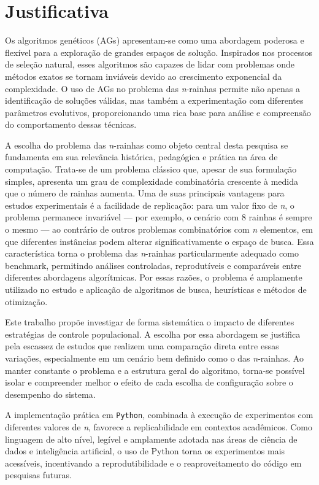\section{Justificativa}

Os algoritmos genéticos (AGs) apresentam-se como uma abordagem poderosa e flexível para a exploração de grandes espaços de solução. Inspirados nos processos de seleção natural, esses algoritmos são capazes de lidar com problemas onde métodos exatos se tornam inviáveis devido ao crescimento exponencial da complexidade. O uso de AGs no problema das \textit{n}-rainhas permite não apenas a identificação de soluções válidas, mas também a experimentação com diferentes parâmetros evolutivos, proporcionando uma rica base para análise e compreensão do comportamento dessas técnicas.

A escolha do problema das \textit{n}-rainhas como objeto central desta pesquisa se fundamenta em sua relevância histórica, pedagógica e prática na área de computação. Trata-se de um problema clássico que, apesar de sua formulação simples, apresenta um grau de complexidade combinatória crescente à medida que o número de rainhas aumenta. Uma de suas principais vantagens para estudos experimentais é a facilidade de replicação: para um valor fixo de \textit{n}, o problema permanece invariável — por exemplo, o cenário com 8 rainhas é sempre o mesmo — ao contrário de outros problemas combinatórios com \textit{n} elementos, em que diferentes instâncias podem alterar significativamente o espaço de busca. Essa característica torna o problema das \textit{n}-rainhas particularmente adequado como benchmark, permitindo análises controladas, reprodutíveis e comparáveis entre diferentes abordagens algorítmicas. Por essas razões, o problema é amplamente utilizado no estudo e aplicação de algoritmos de busca, heurísticas e métodos de otimização.

Este trabalho propõe investigar de forma sistemática o impacto de diferentes estratégias de controle populacional. A escolha por essa abordagem se justifica pela escassez de estudos que realizem uma comparação direta entre essas variações, especialmente em um cenário bem definido como o das \textit{n}-rainhas. Ao manter constante o problema e a estrutura geral do algoritmo, torna-se possível isolar e compreender melhor o efeito de cada escolha de configuração sobre o desempenho do sistema.

A implementação prática em \texttt{Python}, combinada à execução de experimentos com diferentes valores de \textit{n}, favorece a replicabilidade em contextos acadêmicos. Como linguagem de alto nível, legível e amplamente adotada nas áreas de ciência de dados e inteligência artificial, o uso de Python torna os experimentos mais acessíveis, incentivando a reprodutibilidade e o reaproveitamento do código em pesquisas futuras.


